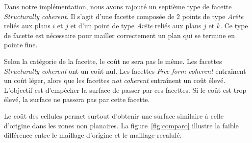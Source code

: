 ﻿\documentclass[12pt, twoside]{article}
\begin{document}
Dans notre implémentation, nous avons rajouté un septième type de facette \textit{Structurally coherent}. Il s'agit d'une facette composée de 2 points de type \textit{Arête} reliés aux plans $i$ et $j$ et d'un point de type \textit{Arête} reliés aux plans $j$ et $k$. Ce type de facette est nécessaire pour mailler correctement un plan qui se termine en pointe fine.

Selon la catégorie de la facette, le coût ne sera pas le même. Les facettes \textit{Structurally coherent} ont un coût nul. Les facettes \textit{Free-form coherent} entraînent un coût léger, alors que les facettes \textit{not coherent} entraînent un coût élevé. L'objectif est d'empécher la surface de passer par ces facettes. Si le coût est trop élevé, la surface ne passera pas par cette facette.

Le coût des cellules permet surtout d'obtenir une surface similaire à celle d'origine dans les zones non planaires. La figure~\ref{fig:comparo} illustre la faible différence entre le maillage d'origine et le maillage recalulé.
\end{document}
